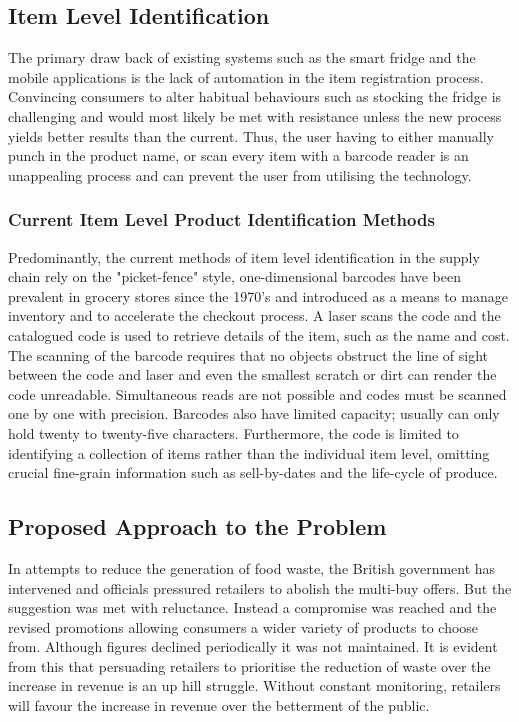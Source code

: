 \documentclass[a4paper, 11pt]{article}
\begin{document}
\subsection{Item Level Identification}
The primary draw back of existing systems such as the smart fridge and the mobile applications is the lack of automation in the item registration process. Convincing consumers to alter habitual behaviours such as stocking the fridge is challenging and would most likely be met with resistance unless the new process yields better results than the current. Thus, the user having to either manually punch in the product name, or scan every item with a barcode reader is an unappealing process and can prevent the user from utilising the technology. 

\subsubsection{Current Item Level Product Identification Methods} 
Predominantly, the current methods of item level identification in the supply chain rely on the "picket-fence" style, one-dimensional barcodes \cite{georgeR} have been prevalent in grocery stores since the 1970's and introduced as a means to manage inventory and to accelerate the checkout process. A laser scans the code and the catalogued code is used to retrieve details of the item, such as the name and cost. The scanning of the barcode requires that no objects obstruct the line of sight between the code and laser and even the smallest scratch or dirt can render the code unreadable. Simultaneous reads are not possible and codes must be scanned one by one with precision. Barcodes also have limited capacity; usually can only hold twenty to twenty-five characters. Furthermore, the code is limited to identifying a collection of items rather than the individual item level, omitting crucial fine-grain information such as sell-by-dates and the life-cycle of produce. 

\subsection{Proposed Approach to the Problem}
In attempts to reduce the generation of food waste, the British government has intervened and officials pressured retailers to abolish the multi-buy offers. But the suggestion was met with reluctance. Instead a compromise was reached and the revised promotions allowing consumers a wider variety of products to choose from. Although figures declined periodically it was not maintained. It is evident from this that persuading retailers to prioritise the reduction of waste over the increase in revenue is an up hill struggle. Without constant monitoring, retailers will favour the increase in revenue over the betterment of the public.\cite{waste}
\end{document}
